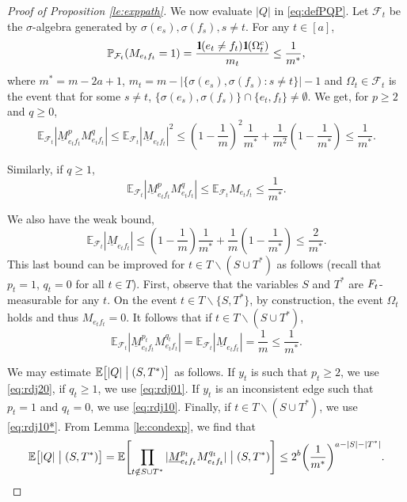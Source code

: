 \documentclass[11pt]{article}
\newcommand{\dE}{\mathbb {E}}
\newcommand{\dP}{\mathbb{P}}
\newcommand{\cF}{\mathcal {F}}
\newcommand{\SBRA}[1]{{{\left[#1\right]}}} %
\newcommand{\PAR}[1]{{{\left(#1\right)}}} %
\newcommand{\1}{1\!\!{\sf I}}\newcommand{\IND}{\1}
\begin{document}
\begin{proof}[Proof of Proposition \ref{le:exppath}]
We now evaluate $|Q|$ in \eqref{eq:defPQP}. Let $\cF_t$ be the $\sigma$-algebra generated by $ \sigma(e_s), \sigma(f_s) , s \ne t$. For any  $ t \in [a]$, 
\begin{equation}\label{eq:MeftP}
\dP_{\cF_t} ( M_{e_t f_t} = 1 )  = \frac{ \IND( e_t \ne f_t)\IND( \Omega^c _t) } { m_t } \leq \frac{ 1} { m^*}, 
\end{equation}
where $m^* = m - 2 a +1$, $m_t = m - | \{ \sigma(e_s) , \sigma(f_s) : s \ne t \}| -1$ and $\Omega_t \in \cF_t$ is the event that for some $s \ne t$, $\{ \sigma(e_s), \sigma(f_s)\} \cap \{e_t,f_t\} \ne \emptyset$. 
We get, for $p \geq 2$ and $q\geq 0$,
\begin{equation} \label{eq:rdj20}
\dE_{\cF_t}  | \underline M_{e_t f_t} ^p M_{e_t f_t}^q |  \leq \dE_{\cF_t}   | \underline M_{e_t f_t} |^2   \leq\PAR{ 1 - \frac 1 m }^2  \frac{ 1} {m^*}  + \frac{1}{m^2}   \PAR{ 1 -  \frac{ 1} { m^*} } \leq \frac{1}{m^*}. 
\end{equation}

Similarly, if $q \geq 1$, 
\begin{equation} \label{eq:rdj01}
\dE_{\cF_t}  | \underline M_{e_t f_t}^p M_{e_t f_t}^q |  \leq \dE_{\cF_t}   M_{e_t f_t}    \leq \frac{1}{m^*}. 
\end{equation}

We also have the weak bound,
\begin{equation} \label{eq:rdj10}
\dE_{\cF_t} |   \underline M_{e_t f_t} |    \leq \PAR{ 1 - \frac 1 m }  \frac{ 1} {m^*}  + \frac{1}{m}   \PAR{ 1 -  \frac{ 1} { m^*} } \leq \frac{2}{m^*}. 
\end{equation}
This last bound can be improved for $t   \in T \backslash ( S \cup T^*)$ as follows (recall that $p_t = 1$, $q_t = 0$ for all $t \in T$). First, observe that the variables $S$ and $T^*$ are $\mathcal \cF_t$-measurable for any $t$. On the event $t \in T \backslash \{ S, T^*\}$, by construction, the event $\Omega_t$ holds and thus $M_{e_t f_t}  = 0$. It follows that if $t   \in T \backslash ( S \cup T^*)$, 
\begin{equation} \label{eq:rdj10*}
\dE_{\cF_t} |   \underline M^{p_t}_{e_t f_t} M_{e_t f_t}^{q_t}|    =\dE_{\cF_t} |   \underline M_{e_t f_t} | = \frac 1 m   \leq \frac{1}{m^*}. 
\end{equation}


We may estimate $\dE \SBRA{  | Q |  \bigm| (S,T^*) }$ as follows. If $y_t$ is such that $p_t \geq 2$, we use \eqref{eq:rdj20},  if  $q_t \geq 1$, we use \eqref{eq:rdj01}. If $y_t$ is an inconsistent edge such that $p_t = 1$ and $q_t = 0$, we use \eqref{eq:rdj10}. Finally, if $t \in T \backslash ( S \cup T^*)$,  we use \eqref{eq:rdj10*}. From Lemma \ref{le:condexp}, we find that
$$
\dE \SBRA{  | Q |  \bigm| (S,T^*) } =  \dE \SBRA{ \prod_{t\notin  S \cup T^* }   | \underline M_{e_tf_t} ^{p_t}  M_{e_tf_t} ^{q_t}| \bigm| (S,T^*) } \leq 2^b \PAR{\frac{1}{m^*} }^{a - |S| - |T^*|}.
$$


\end{proof}
\end{document}
